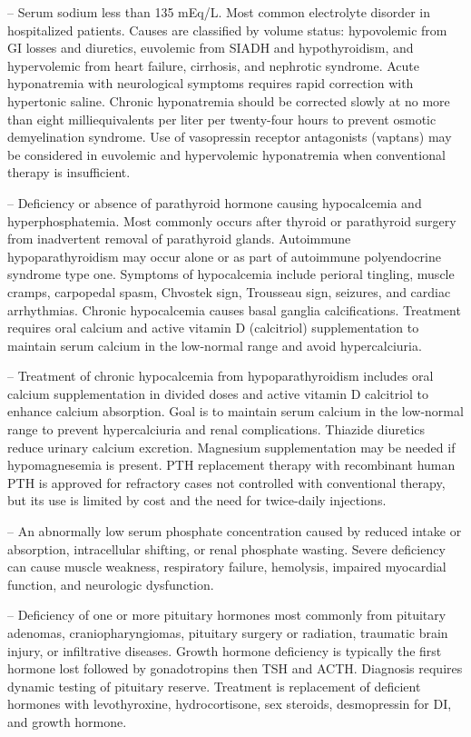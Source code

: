 -- Serum sodium less than 135 mEq/L. Most common electrolyte disorder in hospitalized patients. Causes are classified by volume status: hypovolemic from GI losses and diuretics, euvolemic from SIADH and hypothyroidism, and hypervolemic from heart failure, cirrhosis, and nephrotic syndrome. Acute hyponatremia with neurological symptoms requires rapid correction with hypertonic saline. Chronic hyponatremia should be corrected slowly at no more than eight milliequivalents per liter per twenty-four hours to prevent osmotic demyelination syndrome. Use of vasopressin receptor antagonists (vaptans) may be considered in euvolemic and hypervolemic hyponatremia when conventional therapy is insufficient.

-- Deficiency or absence of parathyroid hormone causing hypocalcemia and hyperphosphatemia. Most commonly occurs after thyroid or parathyroid surgery from inadvertent removal of parathyroid glands. Autoimmune hypoparathyroidism may occur alone or as part of autoimmune polyendocrine syndrome type one. Symptoms of hypocalcemia include perioral tingling, muscle cramps, carpopedal spasm, Chvostek sign, Trousseau sign, seizures, and cardiac arrhythmias. Chronic hypocalcemia causes basal ganglia calcifications. Treatment requires oral calcium and active vitamin D (calcitriol) supplementation to maintain serum calcium in the low-normal range and avoid hypercalciuria.

-- Treatment of chronic hypocalcemia from hypoparathyroidism includes oral calcium supplementation in divided doses and active vitamin D calcitriol to enhance calcium absorption. Goal is to maintain serum calcium in the low-normal range to prevent hypercalciuria and renal complications. Thiazide diuretics reduce urinary calcium excretion. Magnesium supplementation may be needed if hypomagnesemia is present. PTH replacement therapy with recombinant human PTH is approved for refractory cases not controlled with conventional therapy, but its use is limited by cost and the need for twice-daily injections.

-- An abnormally low serum phosphate concentration caused by reduced intake or absorption, intracellular shifting, or renal phosphate wasting. Severe deficiency can cause muscle weakness, respiratory failure, hemolysis, impaired myocardial function, and neurologic dysfunction.

-- Deficiency of one or more pituitary hormones most commonly from pituitary adenomas, craniopharyngiomas, pituitary surgery or radiation, traumatic brain injury, or infiltrative diseases. Growth hormone deficiency is typically the first hormone lost followed by gonadotropins then TSH and ACTH. Diagnosis requires dynamic testing of pituitary reserve. Treatment is replacement of deficient hormones with levothyroxine, hydrocortisone, sex steroids, desmopressin for DI, and growth hormone.


